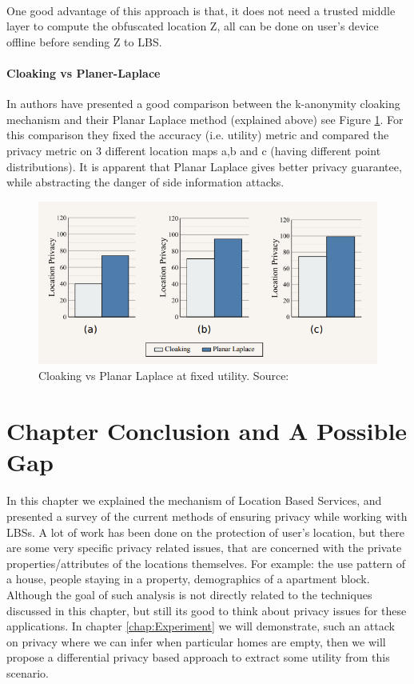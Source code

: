 \documentclass[12pt]{report}
\theoremstyle{named}
\begin{document}
\paragraph{}
One good advantage of this approach is that, it does not need a trusted middle layer to compute the obfuscated location Z, all can be done on user's device offline before sending Z to LBS.
\paragraph{Cloaking vs Planer-Laplace}
In \cite{andres2013geo} authors have presented a good comparison between the k-anonymity cloaking mechanism and their Planar Laplace method (explained above) see Figure \ref{fig:CloakingVsPlanar}. For this comparison they fixed the accuracy (i.e. utility) metric and compared the privacy metric on 3 different location maps a,b and c (having different point distributions). It is apparent that Planar Laplace gives better privacy guarantee, while abstracting the danger of side information attacks.

\begin{figure}[ht]
\centering
        \includegraphics[width=120mm,scale=1]{Images/CloakingVsLaplace.PNG}
    \caption{Cloaking vs Planar Laplace at fixed utility. Source:\cite{andres2013geo}}
    \label{fig:CloakingVsPlanar}
\end{figure}


\section{Chapter Conclusion and A Possible Gap}
\paragraph{}
In this chapter we explained the mechanism of Location Based Services, and presented a survey of the current methods of ensuring privacy while working with LBSs. A lot of work has been done on the protection of user's location, but there are some very specific privacy related issues, that are concerned with the private properties/attributes of the locations themselves. For example: the use pattern of a house, people staying in a property, demographics of a apartment block. Although the goal of such analysis is not directly related to the techniques discussed in this chapter, but still its good to think about privacy issues for these applications. In chapter \ref{chap:Experiment} we will demonstrate, such an attack on privacy where we can infer when particular homes are empty, then we will propose a differential privacy based approach to extract some utility from this scenario.
\end{document}
